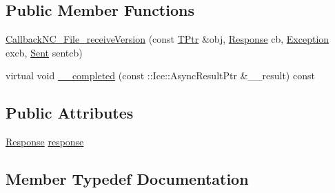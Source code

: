\subsection*{Public Member Functions}
\begin{DoxyCompactItemize}
\item 
\hyperlink{class_file_system_1_1_callback_n_c___file__receive_version_a352d4f6cace878c0e61db502466b8b6f}{Callback\+N\+C\+\_\+\+File\+\_\+receive\+Version} (const \hyperlink{class_file_system_1_1_callback_n_c___file__receive_version_a4bb40a1c1a5f5407c5c42bf0ee950065}{T\+Ptr} \&obj, \hyperlink{class_file_system_1_1_callback_n_c___file__receive_version_aa60cb3d411660e0c5d1c38f3d2fd6977}{Response} cb, \hyperlink{class_file_system_1_1_callback_n_c___file__receive_version_a852c42ee48702dc3f7fe6c0301755500}{Exception} excb, \hyperlink{class_file_system_1_1_callback_n_c___file__receive_version_ab1b34ba3456b31c2a30649702a73c7a6}{Sent} sentcb)
\item 
virtual void \hyperlink{class_file_system_1_1_callback_n_c___file__receive_version_aa9bfe6619d3b126de9478f76d674e0dd}{\+\_\+\+\_\+completed} (const \+::Ice\+::\+Async\+Result\+Ptr \&\+\_\+\+\_\+result) const 
\end{DoxyCompactItemize}
\subsection*{Public Attributes}
\begin{DoxyCompactItemize}
\item 
\hyperlink{class_file_system_1_1_callback_n_c___file__receive_version_aa60cb3d411660e0c5d1c38f3d2fd6977}{Response} \hyperlink{class_file_system_1_1_callback_n_c___file__receive_version_a6acc4146a98beaf8732a5a0836206c54}{response}
\end{DoxyCompactItemize}


\subsection{Member Typedef Documentation}
\hypertarget{class_file_system_1_1_callback_n_c___file__receive_version_a852c42ee48702dc3f7fe6c0301755500}{}
